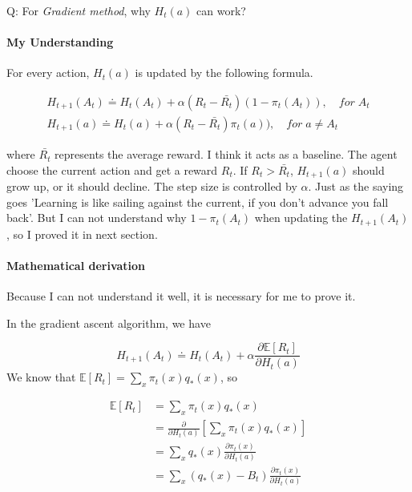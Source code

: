 \documentclass[12pt]{article}
\begin{document}
Q: For \textit{Gradient method}, why $H_t(a)$ can work?

\paragraph*{My Understanding}
For every action, $H_t(a)$ is updated by the following formula.


\begin{equation}
\begin{aligned}
	H_{t+1}(A_t) \doteq H_t(A_t) + \alpha(R_t-\bar{R_t})(1-\pi_t(A_t)),\quad for \; A_t \\
	H_{t+1}(a) \doteq H_t(a) + \alpha(R_t-\bar{R_t})\pi_t(a)),\quad for \; a \neq A_t
\end{aligned}
\end{equation}


where $\bar{R_t}$ represents the average reward. I think it acts as a baseline. The agent choose the current action and get a reward $R_t$. If $R_t > \bar{R_t}$, $H_{t+1}(a)$ should grow up, or it should decline. The step size is controlled by $\alpha$. Just as the saying goes 'Learning is like sailing against the current, if you don't advance you fall back'. But I can not understand why $1-\pi_t(A_t)$ when updating the $H_{t+1}(A_t)$, so I proved it in next section.


\paragraph*{Mathematical derivation}

Because I can not understand it well, it is necessary for me to prove it.

In the gradient ascent algorithm, we have 

\begin{equation}
	H_{t+1}(A_t) \doteq H_t(A_t) + \alpha \frac{\partial \mathbb{E}\left [ R_t \right ]   }{\partial H_t(a)} 
\end{equation}
We know that $\mathbb{E}\left [ R_t \right ] = \sum_{x}\pi_t(x)q_*(x)$, so

\begin{equation}
\begin{aligned}
	\mathbb{E}\left [ R_t \right ] &= \sum_{x}\pi_t(x)q_*(x) \\
	&=\frac{\partial}{\partial H_t(a)}[\sum_{x}\pi_t(x)q_*(x)] \\
	&=\sum_{x}q_*(x)\frac{\partial\pi_t(x)}{\partial H_t(a)} \\
	&=\sum_{x}(q_*(x)-B_t)\frac{\partial\pi_t(x)}{\partial H_t(a)}  \label{ERT}
\end{aligned}
\end{equation}
\end{document}
